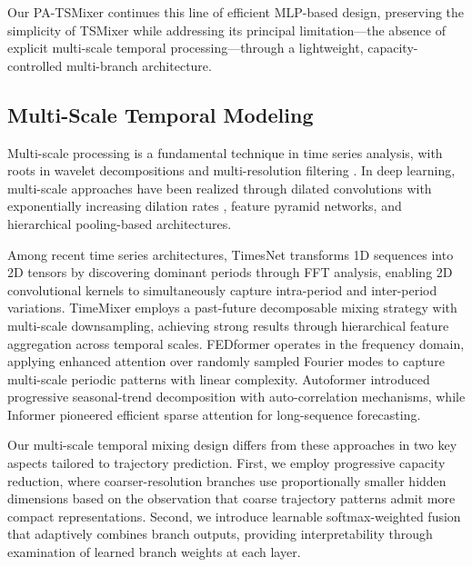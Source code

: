 \documentclass[letterpaper,journal]{IEEEtran}
\begin{document}
Our PA-TSMixer continues this line of efficient MLP-based design, preserving the
simplicity of TSMixer while addressing its principal limitation---the absence of
explicit multi-scale temporal processing---through a lightweight, capacity-controlled
multi-branch architecture.

\subsection{Multi-Scale Temporal Modeling}
Multi-scale processing is a fundamental technique in time series analysis, with
roots in wavelet decompositions and multi-resolution filtering \cite{Percival2000}.
In deep learning, multi-scale approaches have been realized through dilated
convolutions with exponentially increasing dilation rates \cite{Bai2018TCN},
feature pyramid networks, and hierarchical pooling-based architectures.

Among recent time series architectures, TimesNet \cite{Wu2023TimesNet} transforms
1D sequences into 2D tensors by discovering dominant periods through FFT analysis,
enabling 2D convolutional kernels to simultaneously capture intra-period and
inter-period variations. TimeMixer \cite{Wang2024TimeMixer} employs a past-future
decomposable mixing strategy with multi-scale downsampling, achieving strong results
through hierarchical feature aggregation across temporal scales. FEDformer
\cite{Zhou2022FEDformer} operates in the frequency domain, applying enhanced attention
over randomly sampled Fourier modes to capture multi-scale periodic patterns with
linear complexity. Autoformer \cite{Wu2021Autoformer} introduced progressive
seasonal-trend decomposition with auto-correlation mechanisms, while Informer
\cite{Zhou2021Informer} pioneered efficient sparse attention for long-sequence
forecasting.

Our multi-scale temporal mixing design differs from these approaches in two key
aspects tailored to trajectory prediction. First, we employ progressive capacity
reduction, where coarser-resolution branches use proportionally smaller hidden
dimensions based on the observation that coarse trajectory patterns admit more
compact representations. Second, we introduce learnable softmax-weighted fusion
that adaptively combines branch outputs, providing interpretability through
examination of learned branch weights at each layer.
\end{document}
